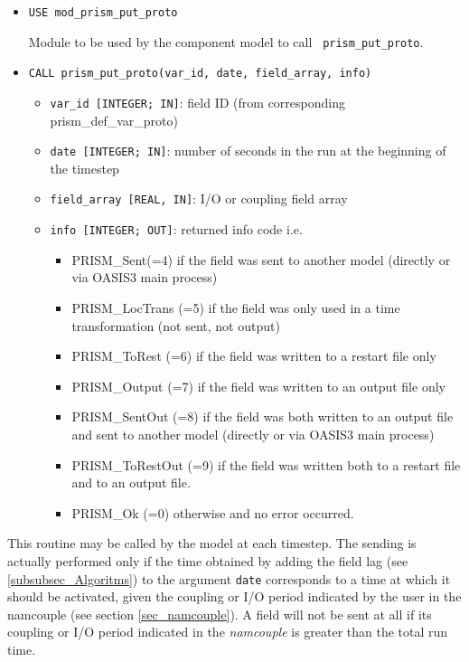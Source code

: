 \begin{itemize} 
\item {\tt USE  mod\_prism\_put\_proto}

Module to be used by the component model to call {\tt
  prism\_put\_proto}.
 
\item {\tt CALL prism\_put\_proto(var\_id, date, field\_array, info)}
\begin{itemize}
\item {\tt var\_id [INTEGER; IN]}: field ID (from
  corresponding prism\_def\_var\_proto)
\item {\tt date [INTEGER; IN]}: number of seconds in the run at the
beginning of the timestep
\item {\tt field\_array [REAL, IN]}: I/O or coupling field array 
\item {\tt info [INTEGER; OUT]}: returned info code i.e.
   \begin{itemize} 
      \item PRISM\_Sent(=4) if the field was sent to another model 
      (directly or via OASIS3 main process)
      \item PRISM\_LocTrans (=5) if the field was only used in a time
       transformation (not sent, not output)
      \item PRISM\_ToRest (=6) if the field was written to a restart file only
      \item PRISM\_Output (=7) if the field was written to an output file only
      \item PRISM\_SentOut (=8) if the field was both written to an output file
       and sent to another model (directly or via OASIS3 main process)
      \item PRISM\_ToRestOut (=9) if the field was written both to a
       restart file and to an output file.
      \item PRISM\_Ok (=0) otherwise and no error occurred.
   \end{itemize}
\end{itemize}
\end{itemize}

This routine may be called by the model at each timestep. The sending
is actually performed only if the time obtained by adding the field
lag (see \ref{subsubsec_Algoritms}) to the argument {\tt date}
corresponds to a time at which it should be activated, given the
coupling or I/O period indicated by the user in the namcouple (see
section \ref{sec_namcouple}). A field will not be sent at all if its
coupling or I/O period indicated in the {\it namcouple} is greater
than the total run time.

